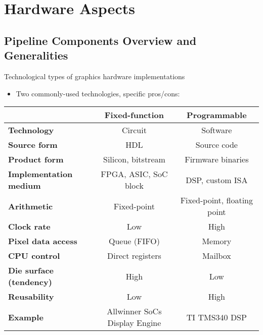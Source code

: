 \section{Hardware Aspects}

\subsection{Pipeline Components Overview and Generalities}

\begin{frame}{Technological types of graphics hardware implementations}
  \begin{itemize}
  \item Two commonly-used technologies, specific pros/cons:
  \end{itemize}

  \begin{center}
  \small
  \def\arraystretch{1.2}
  \begin{tabular}{l|c|c}
  & \textbf{Fixed-function} & \textbf{Programmable} \\
  \hline
  \textbf{Technology} & Circuit & Software \\
  \textbf{Source form} & HDL & Source code \\
  \textbf{Product form} & Silicon, bitstream & Firmware binaries \\
  \textbf{Implementation medium} & FPGA, ASIC, SoC block & DSP, custom ISA \\
  \textbf{Arithmetic} & Fixed-point & Fixed-point, floating point \\
  \textbf{Clock rate} & Low & High \\
  \textbf{Pixel data access} & Queue (FIFO) & Memory \\
  \textbf{CPU control} & Direct registers & Mailbox \\
  \textbf{Die surface (tendency)} & High & Low \\
  \textbf{Reusability} & Low & High \\
  \hline
  \textbf{Example} & Allwinner SoCs Display Engine & TI TMS340 DSP \\
  \end{tabular}
  \end{center}
\end{frame}

